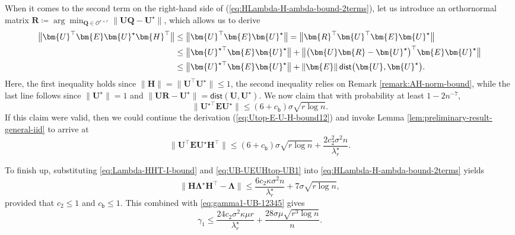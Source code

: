 When it comes to the second term on the right-hand side of (\ref{eq:HLambda-H-ambda-bound-2terms}),
let us introduce an orthornormal matrix $\bm{R}\coloneqq\arg\min_{\bm{Q}\in\mathcal{O}^{r\times r}}\|\bm{U}\bm{Q}-\bm{U}^{\star}\|$,
which allows us to derive
%
\begin{align}
\big\|\bm{U}^{\top}\bm{E}\bm{U}^{\star}\bm{H}^{\top}\big\| & \leq\big\|\bm{U}^{\top}\bm{E}\bm{U}^{\star}\big\|=\big\|\bm{R}^{\top}\bm{U}^{\top}\bm{E}\bm{U}^{\star}\big\| \notag\\
 & \leq\big\|\bm{U}^{\star\top}\bm{E}\bm{U}^{\star}\big\|+\big\|\big(\bm{U}\bm{R}-\bm{U}^{\star}\big)^{\top}\bm{E}\bm{U}^{\star}\big\| \notag\\
	& \leq\big\|\bm{U}^{\star\top}\bm{E}\bm{U}^{\star}\big\|+\|\bm{E}\|\,\mathsf{dist}\big(\bm{U},\bm{U}^{\star}\big). \label{eq:Utop-E-U-H-bound12}
\end{align}
%
Here, the first inequality holds since $\|\bm{H}\|=\|\bm{U}^{\top}\bm{U}^{\star}\|\leq1$,
the second inequality relies on Remark \ref{remark:AH-norm-bound},
while the last line follows since $\|\bm{U}^{\star}\|=1$ and $\|\bm{U}\bm{R}-\bm{U}^{\star}\|=\mathsf{dist}(\bm{U},\bm{U}^{\star})$. 
We now claim that with probability at least $1-2n^{-7}$,
%
\begin{equation}
\|\bm{U}^{\star\top}\bm{E}\bm{U}^{\star}\|\leq(6+c_{\mathsf{b}})\sigma\sqrt{r\log n}.
	\label{eq:claim-Utop-E-Ustar-spectral-norm}
\end{equation}
%
If this claim were valid, then we could continue the derivation (\ref{eq:Utop-E-U-H-bound12}) and invoke Lemma \ref{lem:preliminary-result-general-iid} to arrive at
%
\begin{equation}
\big\|\bm{U}^{\top}\bm{E}\bm{U}^{\star}\bm{H}^{\top}\big\|\leq(6+c_{\mathsf{b}})\sigma\sqrt{r\log n}+\frac{2c_{2}^{2}\sigma^{2}n}{\lambda_{r}^{\star}}.
	\label{eq:UB-UEUHtop-UB1}
\end{equation}
%

To finish up, substituting \eqref{eq:Lambda-HHT-I-bound} and \eqref{eq:UB-UEUHtop-UB1} into \eqref{eq:HLambda-H-ambda-bound-2terms} yields
%
\[
\big\|\bm{H}\bm{\Lambda}^{\star}\bm{H}^{\top}-\bm{\Lambda}\big\|\leq\frac{6c_{2}\kappa\sigma^{2}n}{\lambda_{r}^{\star}}+7\sigma\sqrt{r\log n} , 
\]
%
provided  that $c_2\leq 1$ and $c_{\mathsf{b}}\leq 1$.  
This combined with \eqref{eq:gamma1-UB-12345} gives
%
\begin{equation}
\gamma_{1}\leq\frac{24c_{2}\sigma^{2} \kappa\mu r}{\lambda_{r}^{\star}}+\frac{28\sigma\mu\sqrt{r^{3}\log n}}{n}.
\label{eq:gamma1-UB-2346}
\end{equation}
%




